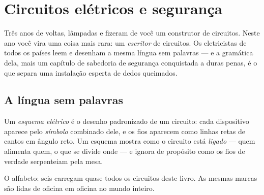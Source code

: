 \chapter{Circuitos elétricos e segurança}\label{ch:g6:circuits-and-safety}

Três anos de voltas, lâmpadas e  fizeram de você um construtor
de circuitos. Neste ano você vira uma coisa mais rara: um
\emph{escritor} de circuitos. Os eletricistas de todos os países leem
e desenham a mesma língua sem palavras --- e a gramática dela, mais
um capítulo de sabedoria de segurança conquistada a duras penas, é o
que separa uma instalação esperta de dedos queimados.

\section{A língua sem palavras}

\begin{definition}\label{def:g6:circuits-and-safety:diagram}
Um \emph{esquema elétrico} é o desenho
padronizado de um circuito: cada dispositivo aparece pelo
\emph{símbolo} combinado dele, e os fios aparecem como
linhas retas de cantos em ângulo reto. Um esquema mostra como o
circuito está \emph{ligado} --- quem alimenta quem, o que se divide
onde --- e ignora de propósito como os fios de verdade serpenteiam
pela mesa.
\end{definition}

\begin{omfigure}

{\small O alfabeto: seis  carregam quase todos os circuitos
deste livro. As mesmas marcas são lidas de oficina em oficina no
mundo inteiro.}
\end{omfigure}

